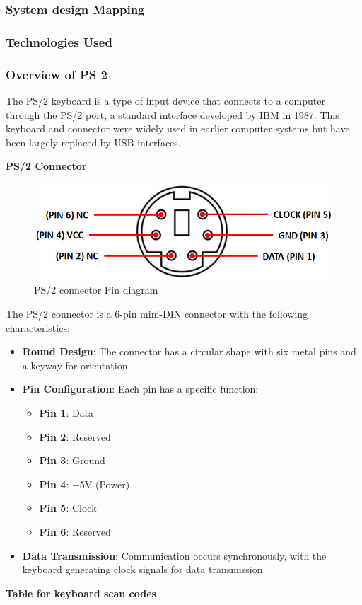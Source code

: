 \documentclass{article}
\numberwithin{equation}{section}
\numberwithin{figure}{section}
\numberwithin{table}{section}
\begin{document}
 \subsubsection{System design Mapping}
    

\pagebreak
\subsubsection{Technologies Used}
\subsubsection {Overview of PS 2}  
The PS/2 keyboard is a type of input device that connects to a computer through the PS/2 port, a standard interface developed by IBM in 1987. This keyboard and connector were widely used in earlier computer systems but have been largely replaced by USB interfaces.\cite{ps2}

\textbf{PS/2 Connector}
      
       
       \label{fig:fig4}
\begin{figure}[htbp]
    \includegraphics[width=0.5\linewidth]{WhatsApp Image 2024-12-02 at 12.30.14 PM.jpeg}
    \centering
    \caption{PS/2 connector Pin diagram}
    \label{fig:fig4}
\end{figure}
    

The PS/2 connector is a 6-pin mini-DIN connector with the following characteristics:
\begin{itemize}
    \item \textbf{Round Design}: The connector has a circular shape with six metal pins and a keyway for orientation.
    \item \textbf{Pin Configuration}: Each pin has a specific function:
    \begin{itemize}
        \item \textbf{Pin 1}: Data
        \item \textbf{Pin 2}: Reserved
        \item \textbf{Pin 3}: Ground
        \item \textbf{Pin 4}: +5V (Power)
        \item \textbf{Pin 5}: Clock
        \item \textbf{Pin 6}: Reserved
    \end{itemize}
    \item \textbf{Data Transmission}: Communication occurs synchronously, with the keyboard generating clock signals for data transmission.
\end{itemize}
\pagebreak
\textbf{Table for keyboard scan codes}\\
\end{document}
